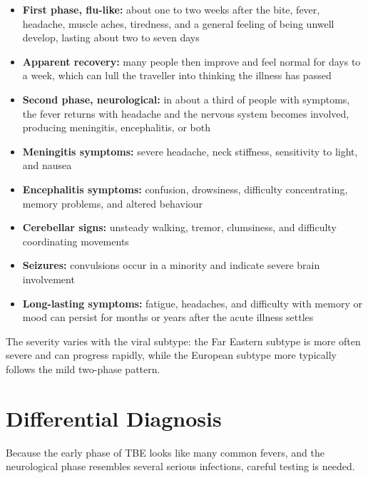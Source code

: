 \begin{itemize}
    \item \textbf{First phase, flu-like:} about one to two weeks after the bite, fever, headache, muscle aches, tiredness, and a general feeling of being unwell develop, lasting about two to seven days
    \item \textbf{Apparent recovery:} many people then improve and feel normal for days to a week, which can lull the traveller into thinking the illness has passed
    \item \textbf{Second phase, neurological:} in about a third of people with symptoms, the fever returns with headache and the nervous system becomes involved, producing meningitis, encephalitis, or both
    \item \textbf{Meningitis symptoms:} severe headache, neck stiffness, sensitivity to light, and nausea
    \item \textbf{Encephalitis symptoms:} confusion, drowsiness, difficulty concentrating, memory problems, and altered behaviour
    \item \textbf{Cerebellar signs:} unsteady walking, tremor, clumsiness, and difficulty coordinating movements
    \item \textbf{Seizures:} convulsions occur in a minority and indicate severe brain involvement
    \item \textbf{Long-lasting symptoms:} fatigue, headaches, and difficulty with memory or mood can persist for months or years after the acute illness settles
\end{itemize}

The severity varies with the viral subtype: the Far Eastern subtype is more often severe and can progress rapidly, while the European subtype more typically follows the mild two-phase pattern.

\section*{Differential Diagnosis}
Because the early phase of TBE looks like many common fevers, and the neurological phase resembles several serious infections, careful testing is needed.

